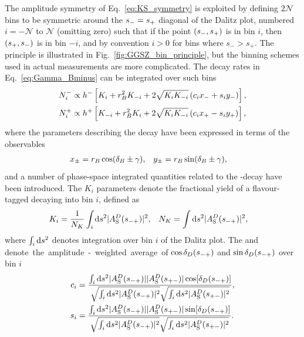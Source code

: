 The amplitude symmetry of Eq.~\eqref{eq:KS_symmetry} is exploited by defining $2\mathcal N$ bins to be symmetric around the $s_-=s_+$ diagonal of the Dalitz plot, numbered $i=-\mathcal N$ to $\mathcal N$ (omitting zero) such that if the point $(s_-, s_+)$ is in bin $i$, then $(s_+, s_-)$ is in bin $-i$, and by convention $i>0$ for bins where $s_- >s_+$. The principle is illustrated in Fig.~\ref{fig:GGSZ_bin_principle}, but the binning schemes used in actual measurements are more complicated. The decay rates in Eq.~\eqref{eq:Gamma_Bminus} can be integrated over such bins 
\begin{align}
\begin{split}    \label{eq:base_GGSZ_yields}
    N^-_i &\propto h^- \left[K_i + r_{B}^2K_{-i} + 2\sqrt{K_iK_{-i}}\left(c_ix_-+s_iy_-\right)\right], \\
    N^+_i &\propto h^+ \left[K_{-i} + r_{B}^2K_i + 2\sqrt{K_iK_{-i}}\left(c_ix_+-s_iy_+\right)\right],
\end{split}
\end{align}
where the parameters describing the \B decay have been expressed in terms of the observables
\begin{align}
    x_\pm &= r_{B} \cos (\delta_{B} \pm \gamma), & y_\pm &= r_{B} \sin (\delta_{B} \pm \gamma),
\end{align}
 and a number of phase-space integrated quantities related to the \D-decay have been introduced. The $K_i$ parameters denote the fractional yield of a flavour-tagged \Dz decaying into bin $i$, defined as
\begin{align}\label{eq:base_ki}
    K_i &= \frac{1}{N_K}\int_i\text{d}s^2 |A_{\rm S}^{D}(s_{-+})|^2, &
    N_K &=\int\text{d}s^2 |A_{\rm S}^{D}(s_{-+})|^2,
\end{align}
where $\int_i \text d s^2$ denotes integration over bin $i$ of the Dalitz plot. The \ci and \si denote the amplitude-weighted average of $\cos \delta_D(s_{-+})$ and $\sin \delta_D(s_{-+})$ over bin $i$
\begin{align}\label{eq:ci_si}
\begin{split}
    c_i &= \frac
    {\int_i \text{d}s^2 |A_{\rm S}^{D}(s_{-+})||A_{\rm S}^{D}(s_{+-})|\cos[\delta_D(s_{-+})]}
    {\sqrt{\int_i \text{d}s^2 |A_{\rm S}^{D}(s_{-+})|^2}\sqrt{\int_i \text{d}s^2 |A_{\rm S}^{D}(s_{+-})|^2}}, \\
    s_i &= \frac
    {\int_i \text{d}s^2 |A_{\rm S}^{D}(s_{-+})||A_{\rm S}^{D}(s_{+-})|\sin[\delta_D(s_{-+})]}
    {\sqrt{\int_i \text{d}s^2 |A_{\rm S}^{D}(s_{-+})|^2}\sqrt{\int_i \text{d}s^2 |A_{\rm S}^{D}(s_{+-})|^2}}.
\end{split}
\end{align}
